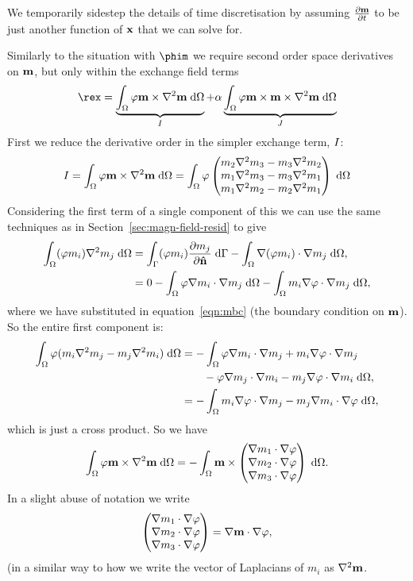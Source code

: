 We temporarily sidestep the details of time discretisation by assuming $\frac{\partial \mathbf{m}}{\partial t}$ to be just another function of $\mathbf{x}$ that we can solve for.


Similarly to the situation with $\phim$ we require second order space derivatives on $\mathbf{m}$, but only within the exchange field terms
\begin{equation}
  \rex = \underbrace{\int_\magd \tbf \mv \times \nabla^2 \mv \d\magd}_{\mxex}
  + \dampc \underbrace{\int_\magd \tbf \mv \times \mv \times \nabla^2 \mv \d\magd}_{\mxmxex}
  \label{eqn:exresterms}
\end{equation}
First we reduce the derivative order in the simpler exchange term, $I$:
\begin{equation}
  I =
  \int_\Omega \varphi \mathbf{m} \times \nabla^2 \mathbf{m} {\; \text{d}}\Omega =
  \int_\Omega \varphi \begin{pmatrix} m_2 \nabla^2m_3 - m_3 \nabla^2m_2  \\ m_1 \nabla^2m_3 - m_3 \nabla^2m_1  \\ m_1 \nabla^2m_2 - m_2 \nabla^2m_1  \end{pmatrix} {\; \text{d}}\Omega
  \notag
\end{equation}
Considering the first term of a single component of this we can use the same techniques as in Section~\ref{sec:magn-field-resid} to give
\begin{align}
  \int_\Omega (\varphi m_i) \nabla^2 m_j {\; \text{d}}\Omega
  &= \int_{\Gamma} (\varphi m_i) \frac{\partial m_j}{\partial \mathbf{\hat{n}}} {\; \text{d}}{\Gamma}
  - \int_\Omega \nabla(\varphi m_i) \cdot \nabla m_j {\; \text{d}}\Omega, \notag \\
  &= 0 - \int_\Omega \varphi \nabla m_i \cdot \nabla m_j {\; \text{d}}\Omega
  -  \int_\Omega m_i \nabla \varphi \cdot \nabla m_j {\; \text{d}}\Omega, \notag
\end{align}
where we have substituted in equation~\eqref{eqn:mbc} (the boundary condition on $\mathbf{m}$).
So the entire first component is:
\begin{equation}
  \begin{aligned}
    \int_\Omega \varphi (m_i \nabla^2m_j - m_j \nabla^2m_i) {\; \text{d}}\Omega
    &= - \int_\Omega \varphi \nabla m_i \cdot \nabla m_j
    +  m_i \nabla \varphi \cdot \nabla m_j \\
    & \qquad - \varphi \nabla m_j \cdot \nabla m_i
    -  m_j \nabla \varphi \cdot \nabla m_i {\; \text{d}}\Omega, \\
    &= -\int_\Omega m_i \nabla \varphi \cdot \nabla m_j - m_j \nabla m_i  \cdot \nabla \varphi {\; \text{d}}\Omega,
  \end{aligned}
\end{equation}
which is just a cross product.
So we have
\begin{equation}
  \int_\Omega \varphi \mathbf{m} \times \nabla^2 \mathbf{m} {\; \text{d}}\Omega =
  -\int_\Omega \mathbf{m} \times \begin{pmatrix} \nabla m_1 \cdot \nabla \varphi \\ \nabla m_2 \cdot \nabla \varphi \\ \nabla m_3 \cdot \nabla \varphi \end{pmatrix} {\; \text{d}}\Omega.
\end{equation}
In a slight abuse of notation we write
\begin{equation}
  \begin{pmatrix} \nabla m_1 \cdot \nabla \varphi \\ \nabla m_2 \cdot \nabla \varphi \\ \nabla m_3 \cdot \nabla \varphi \end{pmatrix} = \nabla \mathbf{m} \cdot \nabla \varphi,
  \label{eqn:gradvecm}
\end{equation}
(in a similar way to how we write the vector of Laplacians of $m_i$ as $\nabla^2 \mathbf{m}$.

